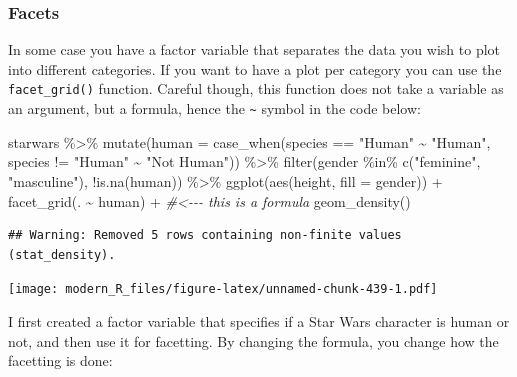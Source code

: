 \documentclass[
]{article}
\newenvironment{Shaded}{\begin{snugshade}}{\end{snugshade}}
\newcommand{\AttributeTok}[1]{\textcolor[rgb]{0.77,0.63,0.00}{#1}}
\newcommand{\CommentTok}[1]{\textcolor[rgb]{0.56,0.35,0.01}{\textit{#1}}}
\newcommand{\FunctionTok}[1]{\textcolor[rgb]{0.00,0.00,0.00}{#1}}
\newcommand{\NormalTok}[1]{#1}
\newcommand{\SpecialCharTok}[1]{\textcolor[rgb]{0.00,0.00,0.00}{#1}}
\newcommand{\StringTok}[1]{\textcolor[rgb]{0.31,0.60,0.02}{#1}}
\begin{document}
\hypertarget{facets}{%
\subsubsection{Facets}\label{facets}}

In some case you have a factor variable that separates the data you wish to plot into different
categories. If you want to have a plot per category you can use the \texttt{facet\_grid()} function.
Careful though, this function does not take a variable as an argument, but a formula, hence the \texttt{\textasciitilde{}}
symbol in the code below:

\begin{Shaded}
\begin{Highlighting}[]
\NormalTok{starwars }\SpecialCharTok{\%\textgreater{}\%}
  \FunctionTok{mutate}\NormalTok{(}\AttributeTok{human =} \FunctionTok{case\_when}\NormalTok{(species }\SpecialCharTok{==} \StringTok{"Human"} \SpecialCharTok{\textasciitilde{}} \StringTok{"Human"}\NormalTok{,}
\NormalTok{                           species }\SpecialCharTok{!=} \StringTok{"Human"} \SpecialCharTok{\textasciitilde{}} \StringTok{"Not Human"}\NormalTok{)) }\SpecialCharTok{\%\textgreater{}\%}
  \FunctionTok{filter}\NormalTok{(gender }\SpecialCharTok{\%in\%} \FunctionTok{c}\NormalTok{(}\StringTok{"feminine"}\NormalTok{, }\StringTok{"masculine"}\NormalTok{), }\SpecialCharTok{!}\FunctionTok{is.na}\NormalTok{(human)) }\SpecialCharTok{\%\textgreater{}\%}
  \FunctionTok{ggplot}\NormalTok{(}\FunctionTok{aes}\NormalTok{(height, }\AttributeTok{fill =}\NormalTok{ gender)) }\SpecialCharTok{+}
  \FunctionTok{facet\_grid}\NormalTok{(. }\SpecialCharTok{\textasciitilde{}}\NormalTok{ human) }\SpecialCharTok{+} \CommentTok{\#\textless{}{-}{-}{-} this is a formula}
  \FunctionTok{geom\_density}\NormalTok{()}
\end{Highlighting}
\end{Shaded}

\begin{verbatim}
## Warning: Removed 5 rows containing non-finite values (stat_density).
\end{verbatim}

\texttt{[image: modern\_R\_files/figure-latex/unnamed-chunk-439-1.pdf]}

I first created a factor variable that specifies if a Star Wars character is human or not, and then
use it for facetting. By changing the formula, you change how the facetting is done:
\end{document}
